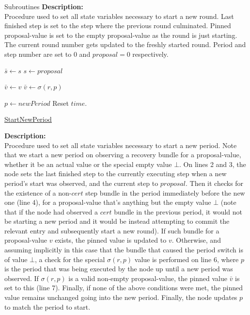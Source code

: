 \documentclass[10pt,a4paper]{article}
\begin{document}
\begin{section}{Subroutines}
\noindent \textbf{Description:}\\
Procedure used to set all state variables necessary to start a new round.
Last finished step is set to the step where the previous round culminated.
Pinned proposal-value is set to the empty proposal-value as the round is just starting.
The current round number gets updated to the freshly started round.
Period and step number are set to $0$ and $proposal=0$ respectively.


\begin{algorithm}[H]\label{algo:start-new-period}
    \begin{algorithmic}[1]

    \State $\bar{s} \gets s$
    \State $s \gets proposal$

        \State $\bar{v} \gets v$
        \State $\bar{v} \gets \sigma(r,p)$
    \EndIf

    \State $p \gets newPeriod$
    \State Reset $time$.
    \EndFunction
    \end{algorithmic}
    \caption{\underline{StartNewPeriod}}
\end{algorithm}

\noindent \textbf{Description:}\\
Procedure used to set all state variables necessary to start a new period.
Note that we start a new period on observing a recovery bundle for a proposal-value, whether it be
an actual value or the special empty value $\bot$.
On lines 2 and 3, the node sets the last finished step to the currently executing step when a new period's
start was observed, and the current step to $proposal$.
Then it checks for the existence of a non-$cert$ step bundle in the period immediately before the new one (line 4), 
for a proposal-value that's anything but the empty value $\bot$ (note that if the node had observed a $cert$
bundle in the previous period, it would not be starting a new period and it would be instead attempting to commit
the relevant entry and subsequently start a new round). If such bundle for a proposal-value $v$ exists, the pinned 
value is updated to $v$.
Otherwise, and assuming implicitly in this case that the bundle that caused the period switch is of value $\bot$,
a check for the special $\sigma(r,p)$ value is performed on line 6, where $p$ is the period that was being executed 
by the node up until a new period was observed. If $\sigma(r,p)$ is a valid non-empty proposal-value, the pinned 
value $\bar{v}$ is set to this (line 7).
Finally, if none of the above conditions were met, the pinned value remains unchanged going into the new period.
Finally, the node updates $p$ to match the period to start.


\end{section}
\end{document}
